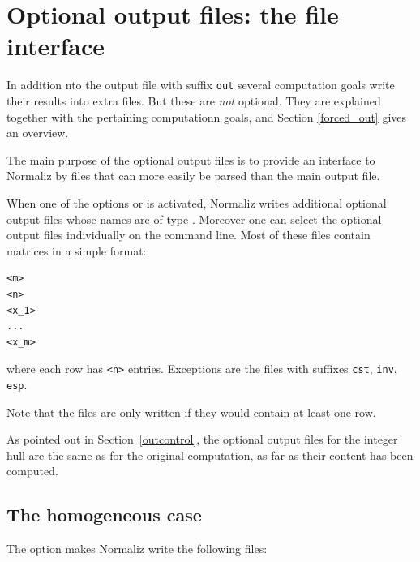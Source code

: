 
\section{Optional output files: the file interface}\label{optionaloutput}

In addition nto the output file with suffix \verb|out| several computation goals write their results into extra files. But these are \emph{not} optional. They are explained together with the pertaining computationn goals, and Section \ref{forced_out} gives an overview. 

The main purpose of the optional output files is to provide an interface to Normaliz by files that can more easily be parsed than the main output file.

When one of the options  or  is activated, Normaliz
writes additional optional output files whose names are of type
. Moreover one can select the optional output files individually on the command line. Most of these files contain matrices in a simple format:
\begin{Verbatim}
<m>
<n>
<x_1>
...
<x_m>
\end{Verbatim}
where each row has \verb|<n>| entries. Exceptions are the files with suffixes \verb|cst|, \verb|inv|, \verb|esp|.

Note that the files are only written if they would contain at least one row.

As pointed out in Section~\ref{outcontrol}, the optional output files for the integer hull are the same as for the original computation, as far as their content has been computed.

\subsection{The homogeneous case}\label{opt_hom_case}

The option  makes Normaliz write the following files:

